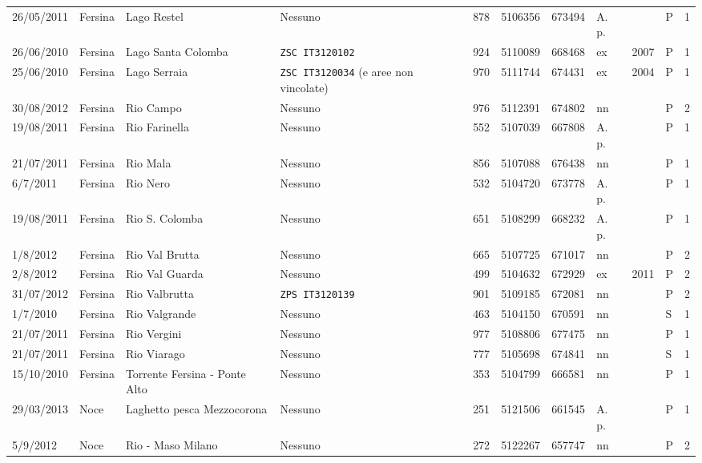 \documentclass[11pt,a4paper,italian,twoside,openany]{memoir}
\begin{document}
\begin{longtable}[c]{p{}p{}p{}p{}p{}p{}p{}p{}p{}p{}l}
26/05/2011 & Fersina & Lago Restel & Nessuno & 878 & 5106356  & 673494 & A. p.  &   & P & 1   \\
\rowcolor[HTML]{EFEFEF} 26/06/2010 & Fersina & Lago Santa Colomba & \texttt{ZSC  IT3120102} & 924 & 5110089  & 668468 & ex   & 2007  & P & 1   \\
25/06/2010 & Fersina & Lago Serraia   & \texttt{ZSC IT3120034} (e aree non vincolate) & 970 & 5111744  & 674431 & ex   & 2004  & P & 1   \\
\rowcolor[HTML]{EFEFEF} 30/08/2012 & Fersina & Rio Campo  & Nessuno & 976 & 5112391  & 674802 & nn   &   & P & 2   \\
19/08/2011 & Fersina & Rio Farinella  & Nessuno & 552 & 5107039  & 667808 & A. p.  &   & P & 1   \\
\rowcolor[HTML]{EFEFEF} 21/07/2011 & Fersina & Rio Mala   & Nessuno & 856 & 5107088  & 676438 & nn   &   & P & 1   \\
6/7/2011  & Fersina & Rio Nero   & Nessuno & 532 & 5104720  & 673778 & A. p.  &   & P & 1   \\
\rowcolor[HTML]{EFEFEF} 19/08/2011 & Fersina & Rio S. Colomba & Nessuno & 651 & 5108299  & 668232 & A. p.  &   & P & 1   \\
1/8/2012  & Fersina & Rio Val Brutta & Nessuno & 665 & 5107725  & 671017 & nn   &   & P & 2   \\
\rowcolor[HTML]{EFEFEF} 2/8/2012  & Fersina & Rio Val Guarda & Nessuno & 499 & 5104632  & 672929 & ex   & 2011  & P & 2   \\
31/07/2012 & Fersina & Rio Valbrutta  & \texttt{ZPS IT3120139}  & 901 & 5109185  & 672081 & nn   &   & P & 2   \\
\rowcolor[HTML]{EFEFEF} 1/7/2010  & Fersina & Rio Valgrande  & Nessuno & 463 & 5104150  & 670591 & nn   &   & S & 1   \\
21/07/2011 & Fersina & Rio Vergini & Nessuno & 977 & 5108806  & 677475 & nn   &   & P & 1   \\
\rowcolor[HTML]{EFEFEF} 21/07/2011 & Fersina & Rio Viarago & Nessuno & 777 & 5105698  & 674841 & nn   &   & S & 1   \\
15/10/2010 & Fersina & Torrente Fersina - Ponte Alto  & Nessuno & 353 & 5104799  & 666581 & nn   &   & P & 1   \\
\rowcolor[HTML]{EFEFEF} 29/03/2013 & Noce & Laghetto pesca Mezzocorona & Nessuno & 251 & 5121506  & 661545 & A. p.  &   & P & 1   \\
5/9/2012  & Noce & Rio - Maso Milano   & Nessuno & 272 & 5122267  & 657747 & nn   &   & P & 2   \\

\end{longtable}
\end{document}
